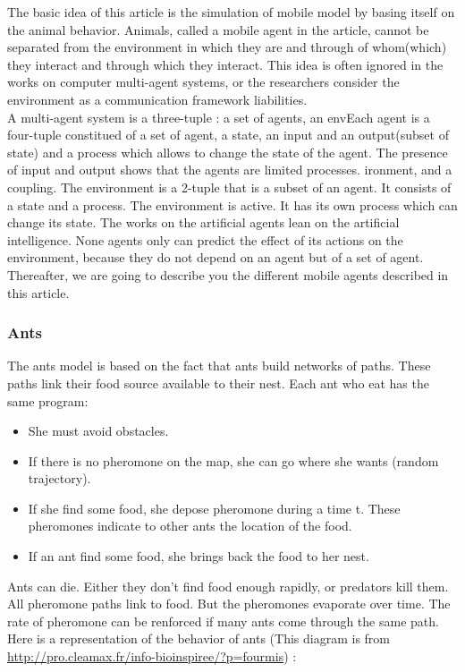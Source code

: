 The basic idea of this article is the simulation of mobile model by basing itself on the animal behavior.
Animals, called a mobile agent in the article, cannot be separated from the environment in which they are and through of whom(which) they interact and through which they interact. This idea is often ignored in the works on computer multi-agent systems, or the researchers consider the environment as a communication framework liabilities.\\
A multi-agent system is a three-tuple : a set of agents, an envEach agent is a four-tuple constitued of a set of agent, a state, an input and an output(subset of state) and a process which allows to change the state of the agent. The presence of input and output shows that the agents are limited processes.
ironment, and a coupling.
The environment is a 2-tuple that is a subset of an agent. It consists of a state and a process. The environment is active. It has its own process which can change its state. The works on the artificial agents lean on the artificial intelligence. None agents only can predict the effect of its actions on the environment, because they do not depend on an agent but of a set of agent.\\
Thereafter, we are going to describe you the different mobile agents described in this article.

\newpage

\subsubsection{Ants}

The ants model is based on the fact that ants build networks of paths. These paths link their food source available to their nest.
Each ant who eat has the same program:

\begin{itemize}
\item She must avoid obstacles.
\item If there is no pheromone on the map, she can go where she wants (random trajectory).
\item If she find some food, she depose pheromone during a time t. These pheromones indicate to other ants the location of the food.
\item If an ant find some food, she brings back the food to her nest.
\end{itemize}

Ants can die. Either they don't find food enough rapidly, or predators kill them.\\
All pheromone paths link to food. But the pheromones evaporate over time.  The rate of pheromone can be renforced if many ants come through the same path.\\
Here is a representation of the behavior of ants (This diagram is from \url{http://pro.cleamax.fr/info-bioinspiree/?p=fourmis}) :

